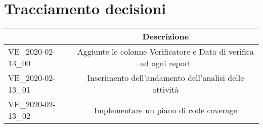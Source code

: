 \section{Tracciamento decisioni}
\renewcommand{\arraystretch}{1.8}

\begin{longtable}{|p{5cm}|c|}
	\hline
	
	\rowcolor{header}
	\centering{\textbf{Codice}} & \textbf{Descrizione} \\
	
	\hline
	
	VE\_2020-02-13\_00 & Aggiunte le colonne Verificatore e Data di verifica ad ogni report \\
	VE\_2020-02-13\_01 & Inserimento dell'andamento dell'analisi delle attività\\
	VE\_2020-02-13\_02 & Implementare un piano di code coverage\\
	\hline
\end{longtable}